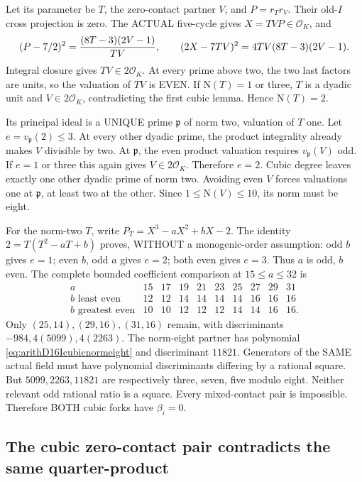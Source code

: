 \documentclass[11pt]{article}
\begin{document}
Let its parameter be \(T\), the
zero-contact partner \(V\), and
\(P=r_Tr_V\).
Their old-\(I\) cross projection is
zero.
The ACTUAL five-cycle gives
\(X=TVP\in\mathcal O_K\), and
\[
 (P-7/2)^2={(8T-3)(2V-1)\over TV},\qquad
                      (2X-7TV)^2=4TV(8T-3)(2V-1).
\]
Integral closure gives \(TV\in2\mathcal O_K\).
At every prime above two, the two last
factors are units, so the valuation
of \(TV\) is EVEN.
If \(\mathrm N(T)=1\) or three,
\(T\) is a dyadic unit and
\(V\in2\mathcal O_K\), contradicting
the first cubic lemma.
Hence \(\mathrm N(T)=2\).

Its principal ideal is a UNIQUE prime
\(\mathfrak p\) of norm two, valuation
of \(T\) one.
Let \(e=v_{\mathfrak p}(2)\le3\).
At every other dyadic prime,
the product integrality already makes
\(V\) divisible by two.
At \(\mathfrak p\), the even product
valuation requires \(v_{\mathfrak p}(V)\)
odd.
If \(e=1\) or three this again gives
\(V\in2\mathcal O_K\).
Therefore \(e=2\).
Cubic degree leaves exactly one other
dyadic prime of norm two.
Avoiding even \(V\) forces valuations
one at \(\mathfrak p\), at least two
at the other.
Since \(1\le\mathrm N(V)\le10\),
its norm must be eight.

For the norm-two \(T\), write
\(P_T=X^3-aX^2+bX-2\).
The identity
\(2=T(T^2-aT+b)\) proves, WITHOUT
a monogenic-order assumption:
odd \(b\) gives \(e=1\);
even \(b\), odd \(a\) gives \(e=2\);
both even gives \(e=3\).
Thus \(a\) is odd, \(b\) even.
The complete bounded coefficient comparison
at \(15\le a\le32\) is
\[
\begin{array}{c|rrrrrrrrr}
a&15&17&19&21&23&25&27&29&31\\ \hline
b\text{ least even}&12&12&14&14&14&14&16&16&16\\
b\text{ greatest even}&10&10&12&12&12&14&14&16&16 .
\end{array}
\]
Only \((25,14),(29,16),(31,16)\)
remain, with discriminants
\(-984,4(5099),4(2263)\).
The norm-eight partner has polynomial
\eqref{eq:arithD16Icubicnormeight}
and discriminant \(11821\).
Generators of the SAME actual field
must have polynomial discriminants
differing by a rational square.
But \(5099,2263,11821\) are respectively
three, seven, five modulo eight.
Neither relevant odd rational ratio
is a square.
Every mixed-contact pair is impossible.
Therefore BOTH cubic forks have
\(\beta_i=0\).

\subsection{The cubic zero-contact pair contradicts the same quarter-product}
\label{app:arithD16Icubicfinish}
\end{document}
